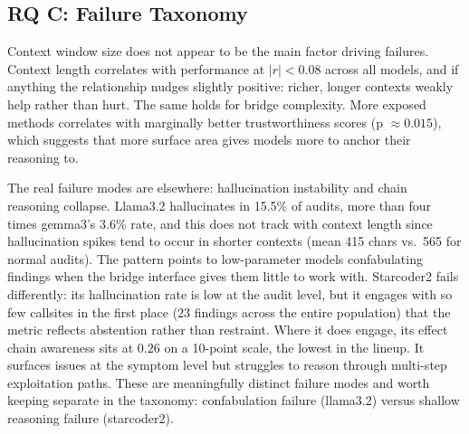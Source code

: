 \subsection{RQ C: Failure Taxonomy}
Context window size does not appear to be the main factor driving failures. Context length correlates with performance at $|r| < 0.08$ across all models, and if anything the relationship nudges slightly positive: richer, longer contexts weakly help rather than hurt. The same holds for bridge complexity. More exposed methods correlates with marginally better trustworthiness scores (p $\approx 0.015$), which suggests that more surface area gives models more to anchor their reasoning to.

The real failure modes are elsewhere: hallucination instability and chain reasoning collapse. Llama3.2 hallucinates in 15.5\% of audits, more than four times gemma3's $3.6\%$ rate, and this does not track with context length since hallucination spikes tend to occur in shorter contexts (mean 415 chars vs.\ 565 for normal audits). The pattern points to low-parameter models confabulating findings when the bridge interface gives them little to work with. Starcoder2 fails differently: its hallucination rate is low at the audit level, but it engages with so few callsites in the first place ($23$ findings across the entire population) that the metric reflects abstention rather than restraint. Where it does engage, its effect chain awareness sits at $0.26$ on a 10-point scale, the lowest in the lineup. It surfaces issues at the symptom level but struggles to reason through multi-step exploitation paths. These are meaningfully distinct failure modes and worth keeping separate in the taxonomy: confabulation failure (llama3.2) versus shallow reasoning failure (starcoder2).

